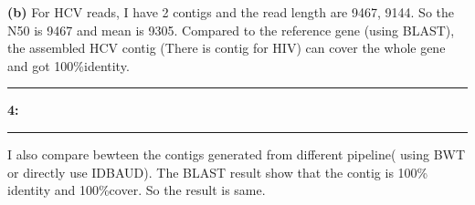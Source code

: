 \documentclass[11pt]{article}
\newcommand\question[2]{\vspace{.25in}\hrule\textbf{#1: #2}\vspace{.5em}\hrule\vspace{.10in}}
\renewcommand\part[1]{\vspace{.10in}\textbf{(#1)}}
\begin{document}
\part{b}
For HCV reads, I have 2 contigs and the read length are 9467, 9144. So the N50 is 9467 and mean is 9305. Compared to the reference gene (using BLAST), the assembled HCV contig (There is contig for HIV) can cover the whole gene and got 100\%identity.

\question{4}{}

I also compare bewteen the contigs generated from different pipeline( using BWT or directly use IDBAUD). The BLAST result show that the contig is 100\% identity and 100\%cover. So the result is same.
\end{document}
